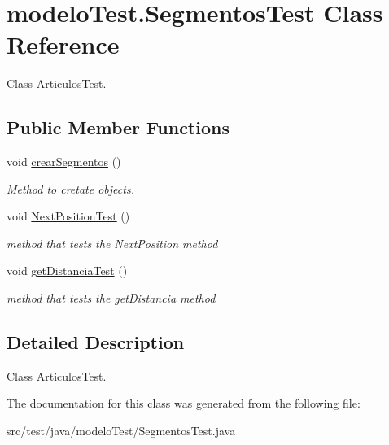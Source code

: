 \hypertarget{classmodelo_test_1_1_segmentos_test}{}\section{modelo\+Test.\+Segmentos\+Test Class Reference}
\label{classmodelo_test_1_1_segmentos_test}


Class \mbox{\hyperlink{classmodelo_test_1_1_articulos_test}{Articulos\+Test}}.  


\subsection*{Public Member Functions}
\begin{DoxyCompactItemize}
\item 
\mbox{\label{classmodelo_test_1_1_segmentos_test_adec536c9b9233edf90250477fa4ae0fe}} 
void \mbox{\hyperlink{classmodelo_test_1_1_segmentos_test_adec536c9b9233edf90250477fa4ae0fe}{crear\+Segmentos}} ()
\begin{DoxyCompactList}\small\item\em Method to cretate objects. \end{DoxyCompactList}\item 
\mbox{\label{classmodelo_test_1_1_segmentos_test_abc7fc571070f145ba88a5bb92eb8deb5}} 
void \mbox{\hyperlink{classmodelo_test_1_1_segmentos_test_abc7fc571070f145ba88a5bb92eb8deb5}{Next\+Position\+Test}} ()
\begin{DoxyCompactList}\small\item\em method that tests the Next\+Position method \end{DoxyCompactList}\item 
\mbox{\label{classmodelo_test_1_1_segmentos_test_a038546ecb6a7d93a5356d6daa705efd8}} 
void \mbox{\hyperlink{classmodelo_test_1_1_segmentos_test_a038546ecb6a7d93a5356d6daa705efd8}{get\+Distancia\+Test}} ()
\begin{DoxyCompactList}\small\item\em method that tests the get\+Distancia method \end{DoxyCompactList}\end{DoxyCompactItemize}


\subsection{Detailed Description}
Class \mbox{\hyperlink{classmodelo_test_1_1_articulos_test}{Articulos\+Test}}. 

The documentation for this class was generated from the following file\+:\begin{DoxyCompactItemize}
\item 
src/test/java/modelo\+Test/Segmentos\+Test.\+java\end{DoxyCompactItemize}
